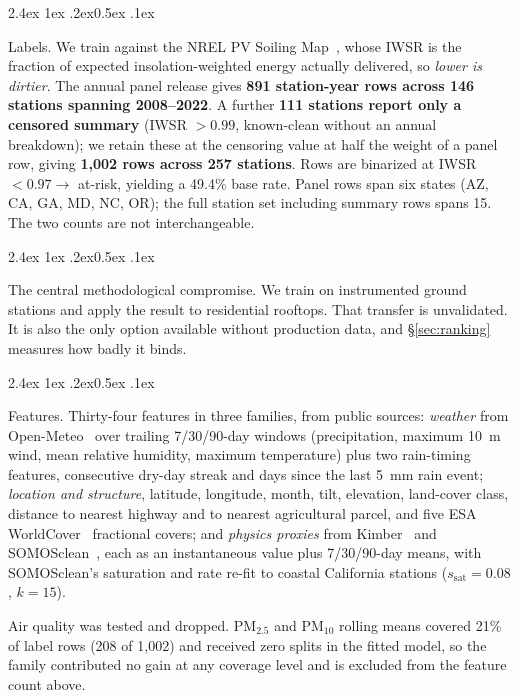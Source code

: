 \documentclass[10pt,twocolumn]{article}
\makeatletter
\renewcommand\paragraph{\@startsection{paragraph}{4}{\z@}%
  {2.4ex \@plus1ex \@minus.2ex}{0.5ex \@plus .1ex}%
  {\normalfont\normalsize\bfseries\raggedright}}
\makeatother
\begin{document}
\paragraph{Labels.}
We train against the NREL PV Soiling Map~\cite{nrel_soiling_map}, whose IWSR is the
fraction of expected insolation-weighted energy actually delivered, so \emph{lower is
dirtier}. The annual panel release gives \textbf{891 station-year rows across 146 stations
spanning 2008--2022}. A further \textbf{111 stations report only a censored summary}
(IWSR $>0.99$, known-clean without an annual breakdown); we retain these at the censoring
value at half the weight of a panel row, giving \textbf{1{,}002 rows across 257 stations}.
Rows are binarized at IWSR $<0.97 \rightarrow$ at-risk, yielding a 49.4\% base rate.
Panel rows span six states (AZ, CA, GA, MD, NC, OR); the full station set including
summary rows spans 15. The two counts are not interchangeable.

\paragraph{The central methodological compromise.}
We train on instrumented ground stations and apply the result to residential rooftops.
That transfer is unvalidated. It is also the only option available without production
data, and \S\ref{sec:ranking} measures how badly it binds.

\paragraph{Features.}
Thirty-four features in three families, from public sources: \emph{weather} from
Open-Meteo~\cite{openmeteo} over trailing 7/30/90-day windows (precipitation, maximum
\SI{10}{\metre} wind, mean relative humidity, maximum temperature) plus two rain-timing
features, consecutive dry-day streak and days since the last \SI{5}{\milli\metre} rain
event; \emph{location and structure}, latitude, longitude, month, tilt, elevation,
land-cover class, distance to nearest highway and to nearest agricultural parcel, and five
ESA WorldCover~\cite{zanaga2022worldcover} fractional covers; and \emph{physics proxies}
from Kimber~\cite{kimber2006} and SOMOSclean~\cite{redondo2023somosclean}, each as an instantaneous
value plus 7/30/90-day means, with SOMOSclean's saturation and rate re-fit to coastal
California stations ($s_{\text{sat}}=0.08$, $k=15$).

Air quality was tested and dropped. PM$_{2.5}$ and PM$_{10}$ rolling means covered 21\% of
label rows (208 of 1{,}002) and received zero splits in the fitted model, so the family
contributed no gain at any coverage level and is excluded from the feature count above.
\end{document}
